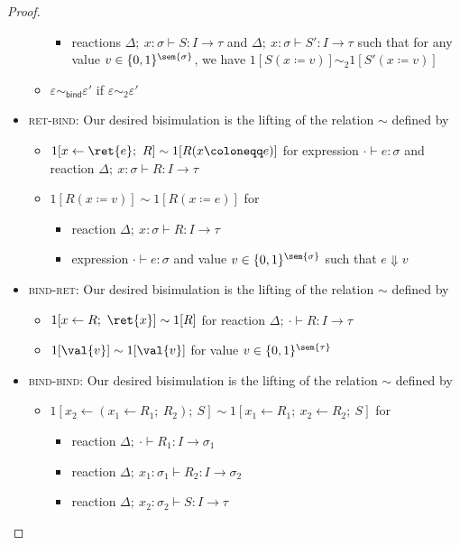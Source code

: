 \begin{proof}
\begin{itemize}
\begin{itemize}
\begin{itemize}
\item reactions $\Delta; \ x : \sigma \vdash S : I \to \tau$ and $\Delta; \ x : \sigma \vdash S' : I \to \tau$ such that for any value $v \in \{0,1\}^{\sem{\sigma}}$, we have $1[S(x \coloneqq v)] \sim_2 1[S'(x \coloneqq v)]$
\end{itemize}
\item $\varepsilon \sim_\mathsf{bind} \varepsilon'$ if $\varepsilon \sim_2 \varepsilon'$
\end{itemize}
\item \textsc{ret-bind}: Our desired bisimulation is the lifting of the relation $\sim$ defined by
\begin{itemize}
\item $1[x \leftarrow \ret{e}; \ R] \sim 1[R(x \coloneqq e)]$ for expression $\cdot \vdash e : \sigma$ and reaction $\Delta; \ x : \sigma \vdash R : I \to \tau$
\item $1[R(x \coloneqq v)] \sim 1[R(x \coloneqq e)]$ for
\begin{itemize}
\item reaction $\Delta; \ x : \sigma \vdash R : I \to \tau$
\item expression $\cdot \vdash e : \sigma$ and value $v \in \{0,1\}^{\sem{\sigma}}$ such that $e \Downarrow v$
\end{itemize}
\end{itemize}
\item \textsc{bind-ret}: Our desired bisimulation is the lifting of the relation $\sim$ defined by
\begin{itemize}
\item $1[x \leftarrow R; \ \ret{x}] \sim 1[R]$ for reaction $\Delta; \ \cdot \vdash R : I \to \tau$
\item $1[\val{v}] \sim 1[\val{v}]$ for value $v \in \{0,1\}^{\sem{\tau}}$
\end{itemize}
\item \textsc{bind-bind}: Our desired bisimulation is the lifting of the relation $\sim$ defined by
\begin{itemize}
\item $1[x_2 \leftarrow (x_1 \leftarrow R_1; \ R_2); \ S] \sim 1[x_1 \leftarrow R_1; \ x_2 \leftarrow R_2; \ S]$ for
\begin{itemize}
\item reaction $\Delta; \ \cdot \vdash R_1 : I \to \sigma_1$
\item reaction $\Delta; \ x_1 : \sigma_1 \vdash R_2 : I \to \sigma_2$
\item reaction $\Delta; \ x_2 : \sigma_2 \vdash S : I \to \tau$

\end{itemize}
\end{itemize}
\end{itemize}
\end{proof}
